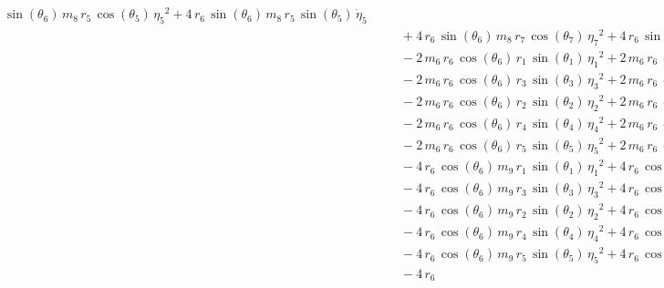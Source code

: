 \begin{eqnarray*}
{}\,\sin({\theta_{6}})\,m_{8}\,r_{5}\,\cos({\theta_{5}})\,{{\eta_{5}}}^
2 + 4\,r_{6}\,\sin({\theta_{6}})\,m_{8}\,r_{5}\,\sin({\theta_{5}})\,{
\dot{\eta}_{5}} \\ &&\quad\mbox{} + 4\,r_{6}\,\sin({\theta_{6}})\,m_{8
}\,r_{7}\,\cos({\theta_{7}})\,{{\eta_{7}}}^2 + 4\,r_{6}\,\sin({\theta
_{6}})\,m_{8}\,r_{7}\,\sin({\theta_{7}})\,{\dot{\eta}_{7}}
 \\ &&\quad\mbox{} - 2\,m_{6}\,r_{6}\,\cos({\theta_{6}})\,r_{1}\,\sin(
{\theta_{1}})\,{{\eta_{1}}}^2 + 2\,m_{6}\,r_{6}\,\cos({\theta_{6}})\,r
_{1}\,\cos({\theta_{1}})\,{\dot{\eta}_{1}} \\ &&\quad\mbox{} - 2\,m_{6
}\,r_{6}\,\cos({\theta_{6}})\,r_{3}\,\sin({\theta_{3}})\,{{\eta_{3}}}^
2 + 2\,m_{6}\,r_{6}\,\cos({\theta_{6}})\,r_{3}\,\cos({\theta_{3}})\,{
\dot{\eta}_{3}} \\ &&\quad\mbox{} - 2\,m_{6}\,r_{6}\,\cos({\theta_{6}}
)\,r_{2}\,\sin({\theta_{2}})\,{{\eta_{2}}}^2 + 2\,m_{6}\,r_{6}\,\cos({
\theta_{6}})\,r_{2}\,\cos({\theta_{2}})\,{\dot{\eta}_{2}}
 \\ &&\quad\mbox{} - 2\,m_{6}\,r_{6}\,\cos({\theta_{6}})\,r_{4}\,\sin(
{\theta_{4}})\,{{\eta_{4}}}^2 + 2\,m_{6}\,r_{6}\,\cos({\theta_{6}})\,r
_{4}\,\cos({\theta_{4}})\,{\dot{\eta}_{4}} \\ &&\quad\mbox{} - 2\,m_{6
}\,r_{6}\,\cos({\theta_{6}})\,r_{5}\,\sin({\theta_{5}})\,{{\eta_{5}}}^
2 + 2\,m_{6}\,r_{6}\,\cos({\theta_{6}})\,r_{5}\,\cos({\theta_{5}})\,{
\dot{\eta}_{5}} \\ &&\quad\mbox{} - 4\,r_{6}\,\cos({\theta_{6}})\,m_{9
}\,r_{1}\,\sin({\theta_{1}})\,{{\eta_{1}}}^2 + 4\,r_{6}\,\cos({\theta
_{6}})\,m_{9}\,r_{1}\,\cos({\theta_{1}})\,{\dot{\eta}_{1}}
 \\ &&\quad\mbox{} - 4\,r_{6}\,\cos({\theta_{6}})\,m_{9}\,r_{3}\,\sin(
{\theta_{3}})\,{{\eta_{3}}}^2 + 4\,r_{6}\,\cos({\theta_{6}})\,m_{9}\,r
_{3}\,\cos({\theta_{3}})\,{\dot{\eta}_{3}} \\ &&\quad\mbox{} - 4\,r_{6
}\,\cos({\theta_{6}})\,m_{9}\,r_{2}\,\sin({\theta_{2}})\,{{\eta_{2}}}^
2 + 4\,r_{6}\,\cos({\theta_{6}})\,m_{9}\,r_{2}\,\cos({\theta_{2}})\,{
\dot{\eta}_{2}} \\ &&\quad\mbox{} - 4\,r_{6}\,\cos({\theta_{6}})\,m_{9
}\,r_{4}\,\sin({\theta_{4}})\,{{\eta_{4}}}^2 + 4\,r_{6}\,\cos({\theta
_{6}})\,m_{9}\,r_{4}\,\cos({\theta_{4}})\,{\dot{\eta}_{4}}
 \\ &&\quad\mbox{} - 4\,r_{6}\,\cos({\theta_{6}})\,m_{9}\,r_{5}\,\sin(
{\theta_{5}})\,{{\eta_{5}}}^2 + 4\,r_{6}\,\cos({\theta_{6}})\,m_{9}\,r
_{5}\,\cos({\theta_{5}})\,{\dot{\eta}_{5}} \\ &&\quad\mbox{} - 4\,r_{6
}
\end{eqnarray*}
